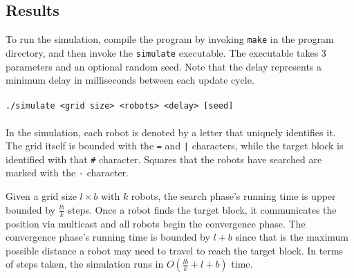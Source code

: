 \documentclass{math}
\begin{document}
\subsection*{Results}
To run the simulation, compile the program by invoking \texttt{make} in the
program directory, and then invoke the \texttt{simulate} executable. The
executable takes 3 parameters and an optional random seed. Note that the delay
represents a minimum delay in milliseconds between each update cycle. \\ \\
\texttt{./simulate <grid size> <robots> <delay> [seed]} \\ \\
In the simulation, each robot is denoted by a letter that uniquely identifies
it. The grid itself is bounded with the \texttt{=} and \texttt{|} characters,
while the target block is identified with that \texttt{\#} character. Squares
that the robots have searched are marked with the \texttt{-} character. \par
Given a grid size \( l\times b \) with \( k \) robots, the search phase's
running time is upper bounded by \( \frac{lb}{k} \) steps. Once a robot finds
the target block, it communicates the position via multicast and all robots
begin the convergence phase. The convergence phase's running time is bounded by
\( l+b \) since that is the maximum possible distance a robot may need to travel
to reach the target block. In terms of steps taken, the simulation runs in
\( O(\frac{lb}{k}+l+b) \) time.
\end{document}
